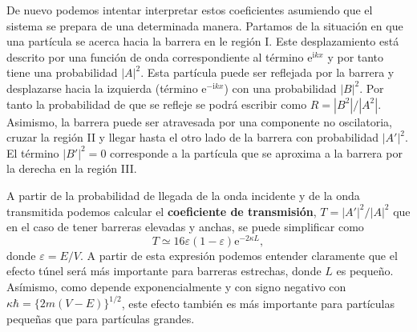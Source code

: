 De nuevo podemos intentar interpretar estos coeficientes 
asumiendo que el sistema se prepara de una determinada 
manera. Partamos de la situación en que una partícula se
acerca hacia la barrera en le región I. Este desplazamiento
está descrito por una función
de onda correspondiente al término $\mathrm{e}^{\mathrm{i}kx}$ 
y por tanto tiene una probabilidad $|A|^2$. Esta partícula
puede ser reflejada por la barrera y desplazarse hacia la
izquierda (término $\mathrm{e}^{-\mathrm{i}kx}$) con una 
probabilidad $|B|^2$. Por tanto la probabilidad de que se
refleje se podrá escribir como $R=|B^2|/|A^2|$. Asimismo,
la barrera puede ser atravesada por una componente no 
oscilatoria, cruzar la región II y llegar hasta el otro lado 
de la barrera con probabilidad $|A'|^2$. El término $|B'|^2=0$
corresponde a la partícula que se aproxima a la barrera por la 
derecha en la región III.

A partir de la probabilidad de llegada de la onda incidente
y de la onda transmitida podemos calcular
el \textbf{coeficiente de transmisión}, 
    $T=|A'|^2/|A|^2$
que en el caso de tener 
barreras elevadas y anchas, se puede simplificar como
\begin{equation}
    T\simeq 16\varepsilon(1-\varepsilon)\mathrm{e}^{-2\kappa L},
\end{equation}
donde $\varepsilon=E/V$. A partir de esta expresión podemos
entender claramente que el efecto túnel será más importante 
para barreras estrechas, donde $L$ es pequeño. Asímismo,
como depende exponencialmente y con signo negativo con 
$\kappa\hbar=\{2m(V-E)\}^{1/2}$, este efecto también es
más importante para partículas pequeñas que para partículas
grandes.

